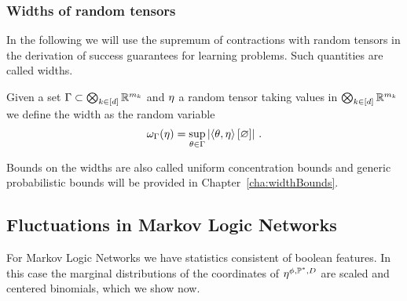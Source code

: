 \subsubsection{Widths of random tensors}

In the following we will use the supremum of contractions with random tensors in the derivation of success guarantees for learning problems.
Such quantities are called widths.

\begin{definition}
	Given a set $\Gamma\subset\bigotimes_{k\in[d]} \mathbb{R}^{m_{k}}$ and $\eta$ a random tensor taking values in $\bigotimes_{k\in[d]} \mathbb{R}^{m_{k}}$ we define the width as the random variable
		\[ \omega_{\Gamma}(\eta) = \sup_{\theta\in\Gamma} \left|\left\langle \theta,\eta\right\rangle \left[ \varnothing \right]\right| \, . \]	
\end{definition}


Bounds on the widths are also called uniform concentration bounds \cite{goessman_uniform_2021} and generic probabilistic bounds will be provided in Chapter~\ref{cha:widthBounds}.





\subsection{Fluctuations in Markov Logic Networks}


For Markov Logic Networks we have statistics consistent of boolean features.
In this case the marginal distributions of the coordinates of $\eta^{\phi,\mathbb{P}^*,D}$ are scaled and centered binomials, which we show now.

